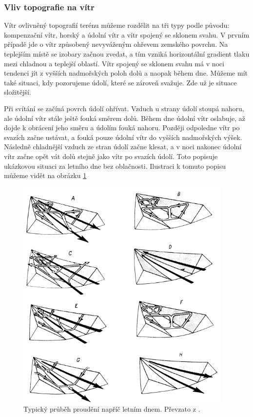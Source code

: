 \subsubsection{Vliv topografie na vítr}
Vítr ovlivněný topografií terénu můžeme rozdělit na tři typy podle původu: kompenzační vítr, horský a údolní vítr a vítr spojený se sklonem svahu. V prvním případě jde o vítr způsobený nevyváženým ohřevem zemského povrchu. Na teplejším místě se izobary začnou zvedat, a tím vzniká horizontální gradient tlaku mezi chladnou a teplejší oblastí. Vítr spojený se sklonem svahu má v noci tendenci jít z vyšších nadmořských poloh dolů a naopak během dne. Můžeme mít také situaci, kdy pozorujeme údolí, které se zároveň svažuje. Zde už je situace složitější.

Při svítání se začíná povrch údolí ohřívat. Vzduch u strany údolí stoupá nahoru, ale údolní vítr stále ještě fouká směrem dolů. Během dne údolní vítr oslabuje, až dojde k obrácení jeho směru a údolím fouká nahoru. Později odpoledne vítr po svazích začne ustávat, a fouká pouze údolní vítr do vyšších nadmořských výšek. Následně chladnější vzduch ze stran údolí začne klesat, a v noci nakonec údolní vítr začne opět vát dolů stejně jako vítr po svazích údolí. Toto popisuje ukázkovou situaci za letního dne bez oblačnosti. Ilustraci k tomuto popisu můžeme vidět na obrázku \ref{fig:valley_winds}

\begin{figure}
	\centering
	\includegraphics[width=0.95\textwidth]{img/ch1/valley_winds.png}
	\caption{Typický průběh proudění napříč letním dnem. Převzato z \cite{alma}.}
	\label{fig:valley_winds}
\end{figure}

